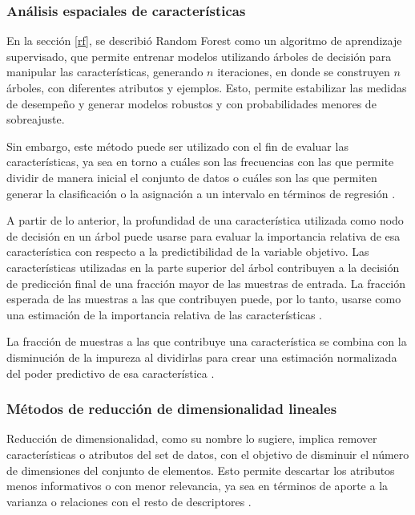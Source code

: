 \subsubsection{Análisis espaciales de características}

En la sección \ref{rf}, se describió Random Forest como un algoritmo de aprendizaje supervisado, que permite entrenar modelos utilizando árboles de decisión para manipular las características, generando $n$ iteraciones, en donde se construyen $n$ árboles, con diferentes atributos y ejemplos. Esto, permite estabilizar las medidas de desempeño y generar modelos robustos y con probabilidades menores de sobreajuste.

Sin embargo, este método puede ser utilizado con el fin de evaluar las características, ya sea en torno a cuáles son las frecuencias con las que permite dividir de manera inicial el conjunto de datos o cuáles son las que permiten generar la clasificación o la asignación a un intervalo en términos de regresión \cite{saeys2008robust}. 

A partir de lo anterior, la profundidad de una característica utilizada como nodo de decisión en un árbol puede usarse para evaluar la importancia relativa de esa característica con respecto a la predictibilidad de la variable objetivo. Las características utilizadas en la parte superior del árbol contribuyen a la decisión de predicción final de una fracción mayor de las muestras de entrada. La fracción esperada de las muestras a las que contribuyen puede, por lo tanto, usarse como una estimación de la importancia relativa de las características \cite{granitto2006recursive}. 

La fracción de muestras a las que contribuye una característica se combina con la disminución de la impureza al dividirlas para crear una estimación normalizada del poder predictivo de esa característica \cite{saeys2008robust}.

\subsubsection{Métodos de reducción de dimensionalidad lineales}

Reducción de dimensionalidad, como su nombre lo sugiere, implica remover características o atributos del set de datos, con el objetivo de disminuir el número de dimensiones del conjunto de elementos. Esto permite descartar los atributos menos informativos o con menor relevancia, ya sea en términos de aporte a la varianza o relaciones con el resto de descriptores \cite{hinton2006reducing}.

